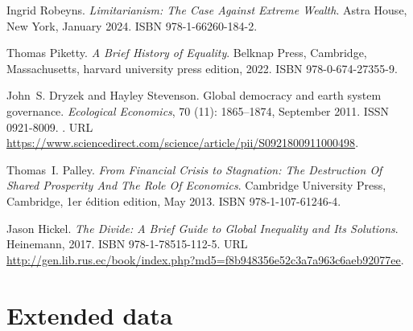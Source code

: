 \begin{thebibliography}{55}
  Ingrid Robeyns.
  \newblock \emph{{Limitarianism: The Case Against Extreme Wealth}}.
  \newblock Astra House, New York, January 2024.
  \newblock ISBN 978-1-66260-184-2.
  
  Thomas Piketty.
  \newblock \emph{A {{Brief History}} of {{Equality}}}.
  \newblock Belknap Press, Cambridge, Massachusetts, harvard university press
    edition, 2022.
  \newblock ISBN 978-0-674-27355-9.
  
  John~S. Dryzek and Hayley Stevenson.
  \newblock Global democracy and earth system governance.
  \newblock \emph{Ecological Economics}, 70 (11): 1865--1874,
    September 2011.
  \newblock ISSN 0921-8009.
  \newblock {}.
  \newblock URL
    \url{https://www.sciencedirect.com/science/article/pii/S0921800911000498}.
  
  Thomas~I. Palley.
  \newblock \emph{{From Financial Crisis to Stagnation: The Destruction Of Shared
    Prosperity And The Role Of Economics}}.
  \newblock Cambridge University Press, Cambridge, 1er {\'e}dition edition, May
    2013.
  \newblock ISBN 978-1-107-61246-4.
  
  Jason Hickel.
  \newblock \emph{The {{Divide}}: {{A Brief Guide}} to {{Global Inequality}} and
    Its {{Solutions}}}.
  \newblock Heinemann, 2017.
  \newblock ISBN 978-1-78515-112-5.
  \newblock URL
    \url{http://gen.lib.rus.ec/book/index.php?md5=f8b948356e52c3a7a963c6aeb92077ee}.
  
  \end{thebibliography}

  



\appendix %
\renewcommand{\thetable}{ED\arabic{table}}
\renewcommand{\thefigure}{ED\arabic{figure}}
\setcounter{figure}{0}
\setcounter{table}{0}

\clearpage
\section*{Extended data}

\begin{table}[h]
  \caption[Campaign and bandwagon effects on the support for the GCS.]{Effects on the support for the GCS of a question on its pros and cons (either in open-ended of closed format) and on information about the actual support, in the U.S. (See Section D %
  in the \textit{US2} Questionnaire)  %
  } \label{tab:branch_gcs}
  \makebox[\textwidth][c]{
      
  }
  {\footnotesize %
  }
\end{table}


